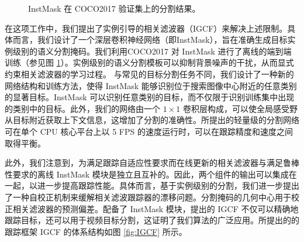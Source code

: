 \begin{figure}
                       \hspace{-0.6em}
    \caption{InstMask 在 COCO2017 \cite{COCO} 验证集上的分割结果。}
    \label{fig:InstMask}
\end{figure}

在这项工作中，我们提出了实例引导的相关滤波器（IGCF）来解决上述限制。具体而言，我们设计了一个深层卷积神经网络（即InstMask），旨在准确生成目标实例级别的语义分割掩码。我们利用COCO2017 \cite{COCO} 对 InstMask 进行了离线的端到端训练（参见图 \ref{fig:InstMask}）。实例级别的语义分割模板可以抑制背景噪声的干扰，从而显式约束相关滤波器的学习过程。
与常见的目标分割任务不同，我们设计了一种新的网络结构和训练方法，使得 InstMask 能够识别位于搜索图像中心附近的任意类别的显著目标。InstMask 可以识别任意类别的目标，而不仅限于识别训练集中出现的类别中的目标。此外，我们的网络由一个 $1 \times 1$ 卷积层构成，可以使全局感受野从目标附近获取上下文信息，这增加了分割的准确性。所提出的轻量级的分割网络可在单个 CPU 核心平台上以 5 FPS 的速度运行时，可以在跟踪精度和速度之间取得平衡。

此外，我们注意到，为满足跟踪自适应性要求而在线更新的相关滤波器与满足鲁棒性要求的离线 InstMask 模块是独立且互补的。因此，两个组件的输出可以集成在一起，以进一步提高跟踪性能。具体而言，基于实例级别的分割，我们进一步提出了一种自校正机制来缓解相关滤波跟踪器的漂移问题。分割掩码的几何中心用于校正相关滤波器的预测偏差。配备了 InstMask 模块，提出的 IGCF 不仅可以精确地跟踪目标，还可以用于视频目标分割，这证明了我们算法的广泛应用。所提出的的跟踪框架 IGCF 的体系结构如图 \ref{fig:IGCF} 所示。

